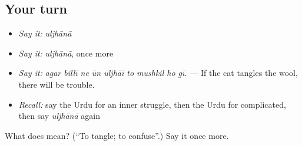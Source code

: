 \subsection*{Your turn}
\begin{itemize}
\raggedright
  \item \emph{Say it:} \emph{uljhānā}
  \item \emph{Say it:} \emph{uljhānā}, once more
  \item \emph{Say it:} \emph{agar billī ne ūn uljhāī to mushkil ho gī.} — If the cat tangles the wool, there will be trouble.
  \item \emph{Recall:} say the Urdu for an inner struggle, then the Urdu for complicated, then say \emph{uljhānā} again
\end{itemize}

\begin{tcolorbox}[breakable,colback=teal!4,colframe=teal!35!black,title={Before you move on}]
What does  mean? (\textquotedblleft{}To tangle; to confuse\textquotedblright{}.) Say it once more.
\end{tcolorbox}
